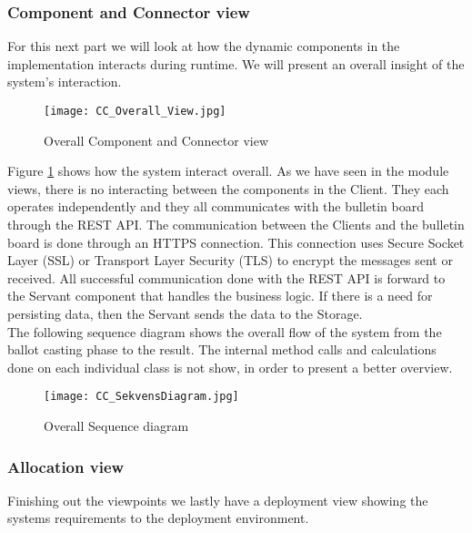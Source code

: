 \subsubsection{Component and Connector view}
For this next part we will look at how the dynamic components in the implementation interacts during runtime. We will present an overall insight of the system's interaction. 

\begin{figure}[H]
    \centering
    \texttt{[image: CC\_Overall\_View.jpg]}
    \caption{Overall Component and Connector view}
    \label{fig:CC_overall_View}
\end{figure}

\noindent
Figure \ref{fig:CC_overall_View} shows how the system interact overall. As we have seen in the module views, there is no interacting between the components in the Client. They each operates independently and they all communicates with the bulletin board through the REST API.  The communication between the Clients and the bulletin board is done through an HTTPS connection. This connection uses Secure Socket Layer (SSL) or Transport Layer Security (TLS) to encrypt the messages sent or received. All successful communication done with the REST API is forward to the Servant component that handles the business logic. If there is a need for persisting data, then the Servant sends the data to the Storage. \\

\noindent
The following sequence diagram shows the overall flow of the system from the ballot casting phase to the result. The internal method calls and calculations done on each individual class is not show, in order to present a better overview.  

\begin{figure}[H]
    \centering
    \texttt{[image: CC\_SekvensDiagram.jpg]}
    \caption{Overall Sequence diagram}
    \label{fig:CC_sequence_diagram}   
\end{figure}

\subsubsection{Allocation view}
Finishing out the viewpoints we lastly have a deployment view showing the systems requirements to the deployment environment. 


